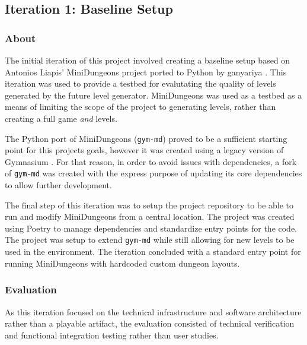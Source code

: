 \subsection{Iteration 1: Baseline Setup}
\subsubsection{About}
The initial iteration of this project involved creating a baseline setup based on Antonios Liapis' MiniDungeons project \cite{liapis_minidungeons} ported to Python by ganyariya \cite{GymMd}.
This iteration was used to provide a testbed for evalutating the quality of levels generated by the future level generator. MiniDungeons was used as a testbed as a means of
limiting the scope of the project to generating levels, rather than creating a full game \textit{and} levels.

The Python port of MiniDungeons (\texttt{gym-md}) \cite{GymMd} proved to be a sufficient starting point for this projects goals, however it was created using a legacy version of Gymnasium \cite{Gymnasium}\cite{towers2025gymnasiumstandardinterfacereinforcement}.
For that reason, in order to avoid issues with dependencies, a fork of \texttt{gym-md}\cite{GymMdFork} was created with the express purpose of updating its core dependencies to allow further development.

The final step of this iteration was to setup the project repository to be able to run and modify MiniDungeons from a central location. The project was created using Poetry\cite{PythonPoetry} to manage dependencies and standardize entry points for the code.
The project was setup to extend \texttt{gym-md} while still allowing for new levels to be used in the environment. The iteration concluded with a standard entry point for running
MiniDungeons with hardcoded custom dungeon layouts.

\subsubsection{Evaluation}
As this iteration focused on the technical infrastructure and software architecture rather than a playable artifact, the evaluation consisted of technical verification and functional integration testing rather than user studies.

